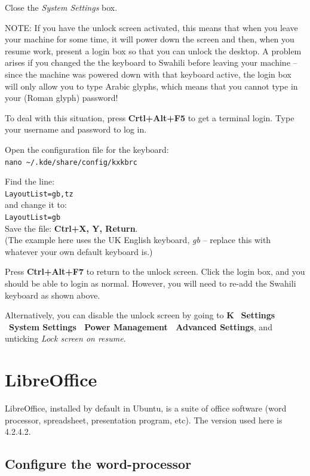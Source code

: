 Close the \textit{System Settings} box.

NOTE: If you have the unlock screen activated, this means that when you leave your machine for some time, it will power down the screen and then, when you resume work, present a login box so that you can unlock the desktop.   A problem arises if you changed the  the keyboard to Swahili before leaving your machine -- since the machine was powered down with that keyboard active, the login box will only allow you to type Arabic glyphs, which means that you cannot type in your (Roman glyph) password!

To deal with this situation, press \textbf{Crtl+Alt+F5} to get a terminal login.  Type your username and password to log in.

Open the configuration file for the keyboard:\\
\verb|nano ~/.kde/share/config/kxkbrc|

Find the line:\\
\verb|LayoutList=gb,tz|\\
and change it to:\\
\verb|LayoutList=gb|\\
Save the file: \textbf{Ctrl+X, Y, Return}.\\
(The example here uses the UK English keyboard, \textit{gb} -- replace this with whatever your own default keyboard is.)

Press \textbf{Ctrl+Alt+F7} to return to the unlock screen.  Click the login box, and you should be able to login as normal.  However, you will need to re-add the Swahili keyboard as shown above.

Alternatively, you can disable the unlock screen by going to \textbf{K} \textrightarrow\ \textbf{Settings} \textrightarrow\ \textbf{System Settings \textrightarrow\ Power Management \textrightarrow\ Advanced Settings}, and unticking \textit{Lock screen on resume}.


\section{LibreOffice}
\label{s:libreoffice}

LibreOffice, installed by default in Ubuntu, is a suite of office software (word processor, spreadsheet, presentation program, etc).  The version used here is 4.2.4.2.

\subsection{Configure the word-processor}

